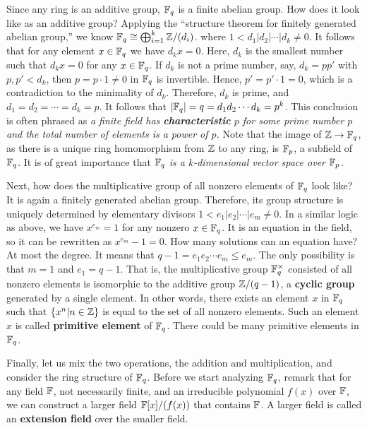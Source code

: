 Since any ring is an additive group, $\mathbb{F}_q$ is a finite abelian group.
How does it look like as an additive group?
Applying the ``structure theorem for finitely generated abelian group,''
we know $\mathbb{F}_q \cong \bigoplus_{i=1}^k \mathbb{Z}/(d_i)$.
where $1 < d_1 | d_2 | \cdots | d_k \neq 0$.
It follows that for any element $x \in \mathbb{F}_q$ we have $d_k x = 0$.
Here, $d_k$ is the smallest number such that $d_k x = 0$ for any $x \in \mathbb{F}_q$.
If $d_k$ is not a prime number, say, $d_k = pp'$ with $p, p' < d_k$,
then $p = p\cdot 1 \neq 0$ in $\mathbb{F}_q$ is invertible.
Hence, $p' = p' \cdot 1 = 0$, which is a contradiction to the minimality of $d_k$.
Therefore, $d_k$ is prime, and $d_1 = d_2 = \cdots = d_k = p$.
It follows that $| \mathbb{F}_q | = q = d_1 d_2 \cdots d_k = p^k$.
This conclusion is often phrased as {\em a finite field has {\bf characteristic} $p$ for some prime number $p$
and the total number of elements is a power of $p$.}
Note that the image of $\mathbb{Z} \to \mathbb{F}_q$, as there is a unique ring homomorphism from $\mathbb{Z}$ to any ring,
is $\mathbb{F}_p$, a subfield of $\mathbb{F}_q$.
It is of great importance that {\em $\mathbb{F}_q$ is a $k$-dimensional vector space over $\mathbb{F}_p$.}


Next, how does the multiplicative group of all nonzero elements of $\mathbb{F}_q$ look like?
It is again a finitely generated abelian group.
Therefore, its group structure is uniquely determined by elementary divisors $1< e_1 | e_2 | \cdots |e_m \neq 0$.
In a similar logic as above, we have $x^{e_m} = 1$ for any nonzero $x \in \mathbb{F}_q$.
It is an equation in the field, so it can be rewritten as $x^{e_m} -1 = 0$.
How many solutions can an equation have? At most the degree.
It means that $q-1 = e_1 e_2 \cdots e_m \le e_m$.
The only possibility is that $m = 1$ and $e_1 = q-1$.
That is, the multiplicative group $\mathbb{F}_q^\times$ consisted of all nonzero elements
is isomorphic to the additive group $\mathbb{Z}/(q-1)$, a {\bf cyclic group} generated by a single element.
In other words, there exists an element $x$ in $\mathbb{F}_q$ such that
$\{ x^n | n \in \mathbb{Z} \}$ is equal to the set of all nonzero elements.
Such an element $x$ is called {\bf primitive element} of $\mathbb{F}_q$.
There could be many primitive elements in $\mathbb{F}_q$.


Finally, let us mix the two operations, the addition and multiplication, and consider the ring structure of $\mathbb{F}_q$.
Before we start analyzing $\mathbb{F}_q$,  remark that for
any field $\mathbb{F}$, not necessarily finite, and an irreducible polynomial $f(x)$ over $\mathbb{F}$,
we can construct a larger field $\mathbb{F}[x]/(f(x))$ that contains $\mathbb{F}$.
A larger field is called an {\bf extension field} over the smaller field.


